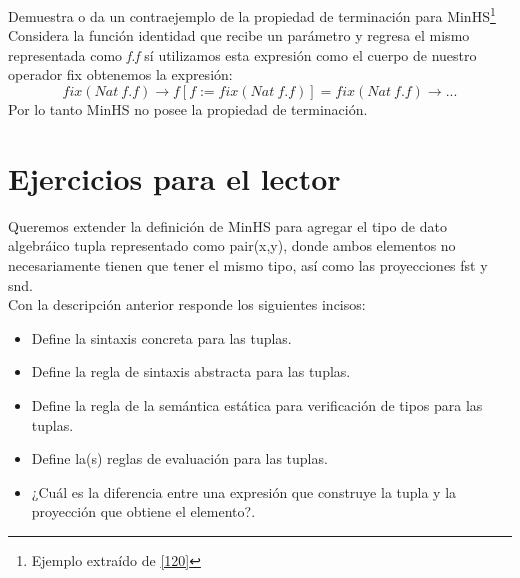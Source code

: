         \begin{exercise}
            Demuestra o da un contraejemplo de la propiedad de terminación para \textsf{MinHS}\footnote{Ejemplo extraído de \hyperlink{120}{[120]}}\\

            Considera la función identidad que recibe un parámetro y regresa el mismo representada como \textit{f.f} sí utilizamos esta expresión como el cuerpo de nuestro operador \textsf{fix} obtenemos la expresión:
            \[
                \textit{fix}(Nat\ f.f) \to f[f:=fix(Nat\ f.f)] = fix(Nat\ f.f)  \to ...
            \]
            Por lo tanto \textsf{MinHS} no posee la propiedad de terminación.
        \end{exercise}


\section{Ejercicios para el lector}

    \begin{exercise}
        Queremos extender la definición de \textsf{MinHS} para agregar el tipo de dato algebráico tupla representado como \textsf{pair(x,y)}, donde ambos elementos no necesariamente tienen que tener el mismo tipo, así como las proyecciones \textsf{fst} y \textsf{snd}.\\

        Con  la descripción anterior responde los siguientes incisos:\\
        \begin{itemize}
            \item Define la sintaxis concreta para las tuplas.
            \item Define la regla de sintaxis abstracta para las tuplas.
            \item Define la regla de la semántica estática para verificación de tipos para las tuplas.
            \item Define la(s) reglas de evaluación para las tuplas.
            \item ¿Cuál es la diferencia entre una expresión que construye la tupla y la proyección que obtiene el elemento?.
        \end{itemize}
    \end{exercise}

\bigskip

